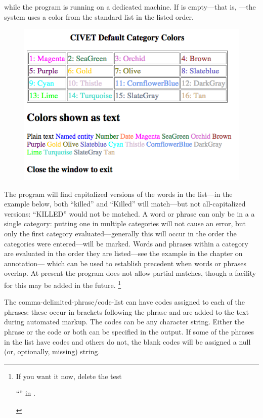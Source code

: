 \documentclass[letterpaper,10pt,english]{sphinxmanual}
\begin{document}
\begin{DUlineblock}{0em}
\item[] while the program is running on a dedicated machine. If \code{{[}color{]}} is
empty—that is, \code{{[}{]}}—the system uses a color from the standard list
in the listed order.
\end{DUlineblock}
\begin{figure}[htbp]
\centering

\includegraphics{defaultcolors.png}
\end{figure}

The program will find capitalized versions of the words in the list—in
the example below, both ``killed'' and ``Killed'' will match—but not
all-capitalized versions: ``KILLED'' would not be matched. A word or
phrase can only be in a a single category: putting one in multiple
categories will not cause an error, but only the first category
evaluated—generally this will occur in the order the categories were
entered—will be marked. Words and phrases within a category are
evaluated in the order they are listed—see the example in the chapter on annotation—
which can be used to establish precedent when words or
phrases overlap. At present the program does not allow partial matches,
though a facility for this may be added in the future. \footnote{
\begin{DUlineblock}{0em}
\item[] If you want it now, delete the test
\item[] “” in
.
\end{DUlineblock}
}

The comma-delimited-phrase/code-list can have codes assigned to each of
the phrases: these occur in brackets following the phrase and are added
to the text during automated markup. The codes can be any character
string. Either the phrase or the code or both can be specified in the
output. If some of the phrases in the list have codes and others do not,
the blank codes will be assigned a null (or, optionally, missing)
string.
\end{document}
